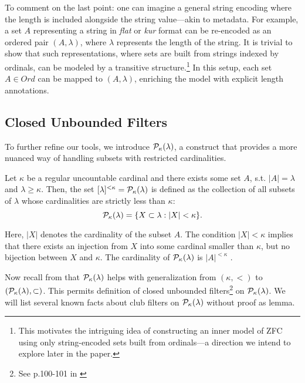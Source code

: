 To comment on the last point: one can imagine a general string encoding where the length is included alongside the string value—akin to metadata. For example, a set $A$ representing a string in \textit{flat} or \textit{kur} format can be re-encoded as an ordered pair $(A, \lambda)$, where $\lambda$ represents the length of the string. It is trivial to show that such representations, where sets are built from strings indexed by ordinals, can be modeled by a transitive structure.\footnote{This motivates the intriguing idea of constructing an inner model of ZFC using only string-encoded sets built from ordinals—a direction we intend to explore later in the paper.} In this setup, each set $A \in Ord$ can be mapped to $(A, \lambda)$, enriching the model with explicit length annotations.

\subsection{Closed Unbounded Filters}

To further refine our tools, we introduce \( \mathcal{P}_\kappa(\lambda) \), a construct that provides a more nuanced way of handling subsets with restricted cardinalities.

\begin{definition}\label{def_kappa_small_subsets_of_lambda}
    Let \( \kappa \) be a regular uncountable cardinal and there exists some set $A$, s.t. $|A| = \lambda $ and $ \lambda \geq \kappa$. Then, the set \( [\lambda]^{<\kappa} = \mathcal{P}_\kappa(\lambda) \) is defined as the collection of all subsets of \( \lambda \) whose cardinalities are strictly less than \( \kappa \):
    \[
    \mathcal{P}_\kappa(\lambda) = \{ X \subset \lambda : |X| < \kappa \}.
    \]
\end{definition}

Here, \( |X| \) denotes the cardinality of the subset \( A \). The condition \( |X| < \kappa \) implies that there exists an injection from \( X \) into some cardinal smaller than \( \kappa \), but no bijection between \( X \) and \( \kappa \). The cardinality of $\mathcal{P}_\kappa(\lambda)$ is $|A|^{<\kappa}$ \cite{jech2003set}.

Now recall from \cite{jech2003set} that $\mathcal{P}_\kappa(\lambda)$ helps with generalization from $(\kappa, <)$ to $(\mathcal{P}_\kappa(\lambda), \subset)$. This permits definition of closed unbounded filters\footnote{See p.100-101 in \cite{jech2003set}} on $\mathcal{P}_\kappa(\lambda)$. We will list several known facts about club filters on $\mathcal{P}_\kappa(\lambda)$ without proof as lemma.

